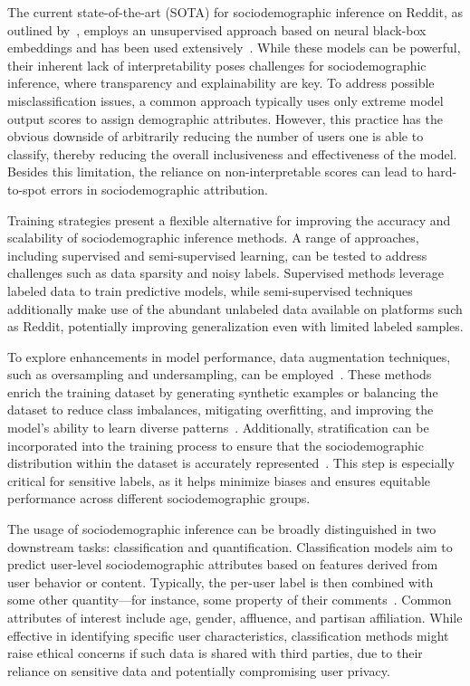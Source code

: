 The current state-of-the-art (SOTA) for sociodemographic inference on Reddit, as outlined by~\citet{waller2021quantifying}, employs an unsupervised approach based on neural black-box embeddings and has been used extensively~\cite{colacrai2024navigating,del2023mental,hermida2023mental,xia2024integrated,monti2023evidence,hanley2023sub,corso2024longitudinal,lenti2024causal}.
While these models can be powerful, their inherent lack of interpretability poses challenges for sociodemographic inference, where transparency and explainability are key.
To address possible misclassification issues, a common approach typically uses only extreme model output scores to assign demographic attributes.
However, this practice has the obvious downside of arbitrarily reducing the number of users one is able to classify, thereby reducing the overall inclusiveness and effectiveness of the model.
Besides this limitation, the reliance on non-interpretable scores can lead to hard-to-spot errors in sociodemographic attribution.

Training strategies present a flexible alternative for improving the accuracy and scalability of sociodemographic inference methods.
A range of approaches, including supervised and semi-supervised learning, can be tested to address challenges such as data sparsity and noisy labels.
Supervised methods leverage labeled data to train predictive models, while semi-supervised techniques additionally make use of the abundant unlabeled data available on platforms such as Reddit, potentially improving generalization even with limited labeled samples.

To explore enhancements in model performance, data augmentation techniques, such as oversampling and undersampling, can be employed~\cite{chawla2002smote,he2008adasyn}.
These methods enrich the training dataset by generating synthetic examples or balancing the dataset to reduce class imbalances, mitigating overfitting, and improving the model’s ability to learn diverse patterns~\cite{shorten2019survey}.
Additionally, stratification can be incorporated into the training process to ensure that the sociodemographic distribution within the dataset is accurately represented~\cite{shahrokh2014effect}.
This step is especially critical for sensitive labels, as it helps minimize biases and ensures equitable performance across different sociodemographic groups.


The usage of sociodemographic inference can be broadly distinguished in two downstream tasks: classification and quantification.
Classification models aim to predict user-level sociodemographic attributes based on features derived from user behavior or content. Typically, the per-user label is then combined with some other quantity---for instance, some property of their comments~\cite{de2022social}.
Common attributes of interest include age, gender, affluence, and partisan affiliation.
While effective in identifying specific user characteristics, classification methods might raise ethical concerns if such data is shared with third parties, due to their reliance on sensitive data and potentially compromising user privacy.

